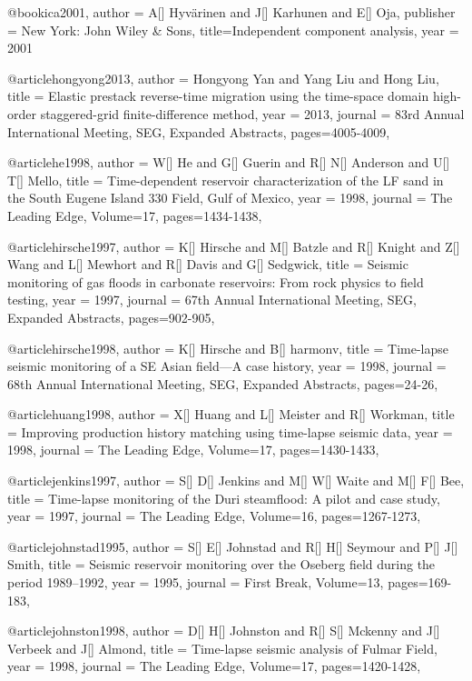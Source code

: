 @book{ica2001,
   author =       {A[] Hyv\"{a}rinen  and J[] Karhunen and E[] Oja},
   publisher =    {New York: John Wiley \& Sons},
   title={Independent component analysis},
   year =         {2001}
}


@article{hongyong2013,
  author =	 {Hongyong Yan and Yang Liu and Hong Liu},
  title =	 {Elastic prestack reverse-time migration using the time-space domain high-order staggered-grid finite-difference method},
  year =	 2013,
  journal =	 {83rd Annual International Meeting, SEG, Expanded Abstracts},
 pages=4005-4009,
}

@article{he1998,
  author =	 {W[] He and G[] Guerin and R[] N[] Anderson and U[] T[] Mello},
  title =	 {Time-dependent reservoir characterization of the LF sand in the South Eugene Island 330 Field, Gulf of Mexico},
  year =	 1998,
  journal =	 {The Leading Edge},
    Volume=17,
 pages=1434-1438,
}

@article{hirsche1997,
  author =	 {K[] Hirsche and M[] Batzle and R[] Knight and Z[] Wang and L[] Mewhort and R[] Davis and G[] Sedgwick},
  title =	 {Seismic monitoring of gas floods in carbonate reservoirs: From rock physics to field testing},
  year =	 1997,
  journal =	 {67th Annual International Meeting, SEG, Expanded Abstracts},
 pages=902-905,
}

@article{hirsche1998,
  author =	 {K[] Hirsche and B[] harmonv},
  title =	 {Time-lapse seismic monitoring of a SE Asian field—A case history},
  year =	 1998,
  journal =	 {68th Annual International Meeting, SEG, Expanded Abstracts},
 pages=24-26,
}

@article{huang1998,
  author =	 {X[] Huang and L[] Meister and R[] Workman},
  title =	 {Improving production history matching using time-lapse seismic data},
  year =	 1998,
  journal =	 {The Leading Edge},
    Volume=17,
 pages=1430-1433,
}

@article{jenkins1997,
  author =	 {S[] D[] Jenkins and M[] W[] Waite and M[] F[] Bee},
  title =	 {Time-lapse monitoring of the Duri steamflood: A pilot and case study},
  year =	 1997,
  journal =	 {The Leading Edge},
    Volume=16,
 pages=1267-1273,
}


@article{johnstad1995,
  author =	 {S[] E[] Johnstad and R[] H[] Seymour and P[] J[] Smith},
  title =	 { Seismic reservoir monitoring over the Oseberg field during the period 1989–1992},
  year =	 1995,
  journal =	 {First Break},
    Volume=13,
 pages=169-183,
}


@article{johnston1998,
  author =	 {D[] H[] Johnston and R[] S[] Mckenny and J[] Verbeek and J[] Almond},
  title =	 {Time-lapse seismic analysis of Fulmar Field},
  year =	 1998,
  journal =	 {The Leading Edge},
    Volume=17,
 pages=1420-1428,
}

